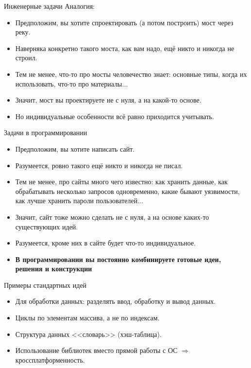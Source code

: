 \begin{frame}{Инженерные задачи}
	Аналогия:
	\begin{itemize}
		\item Предположим, вы хотите спроектировать (а потом построить) мост через реку.
		\item Наверняка конкретно такого моста, как вам надо, ещё никто и никогда не строил.
		\item Тем не менее, что-то про мосты человечество знает: основные типы, когда их использовать, что-то про материалы...
		\item Значит, мост вы проектируете не с нуля, а на какой-то основе.
		\item Но индивидуальные особенности всё равно приходится учитывать.
	\end{itemize}
\end{frame}

\begin{frame}{Задачи в программировании}
	\begin{itemize}
		\item Предположим, вы хотите написать сайт.
		\item Разумеется, ровно такого ещё никто и никогда не писал.
		\item
			Тем не менее, про сайты много чего известно: как хранить данные,
			как обрабатывать несколько запросов одновременно, какие бывают уязвимости, как лучше хранить пароли пользователей...
		\item Значит, сайт тоже можно сделать не с нуля, а на основе каких-то существующих идей.
		\item Разумеется, кроме них в сайте будет что-то индивидуальное.
		\item \textbf{В программировании вы постоянно комбинируете готовые идеи, решения и конструкции}
	\end{itemize}
\end{frame}

\begin{frame}{Примеры стандартных идей}
	\begin{itemize}
		\item Для обработки данных: разделять ввод, обработку и вывод данных.
		\item Циклы по элементам массива, а не по индексам.
		\item Структура данных <<словарь>> (хэш-таблица).
		\item Использование библиотек вместо прямой работы с ОС $\Rightarrow$ кроссплатформенность.
	\end{itemize}
\end{frame}
